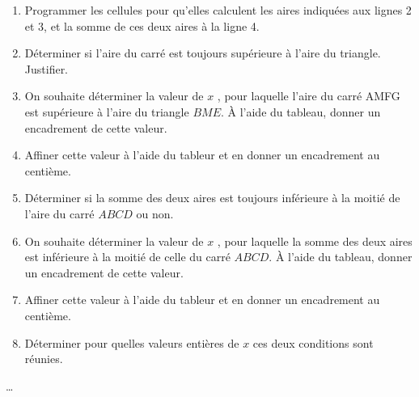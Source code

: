 \begin{exercice*}[\tableurLogo]
\begin{enumerate}
        \smallskip
        \item Programmer les cellules pour qu'elles calculent les aires indiquées aux lignes 2 et 3, et la somme de ces deux aires à la ligne 4.
        \item Déterminer si l'aire du carré est toujours supérieure à l'aire du triangle. Justifier.
        \item On souhaite déterminer la valeur de $x$ , pour laquelle l'aire du carré AMFG est supérieure à l'aire du triangle $BME$. À l'aide du tableau, donner un encadrement de cette valeur.
        \item Affiner cette valeur à l'aide du tableur et en donner un encadrement au centième.
        \item Déterminer si la somme des deux aires est toujours inférieure à la moitié de l'aire du carré $ABCD$ ou non.
        \item On souhaite déterminer la valeur de $x$ , pour laquelle la somme des deux aires est inférieure à la moitié de celle du carré $ABCD$. 
        À l'aide du tableau, donner un encadrement de cette valeur.
        \item Affiner cette valeur à l'aide du tableur et en donner un encadrement au centième.
        \item Déterminer pour quelles valeurs entières de $x$ ces deux conditions sont réunies.
    \end{enumerate}
\end{exercice*}
\begin{corrige}
    \dots
\end{corrige}

